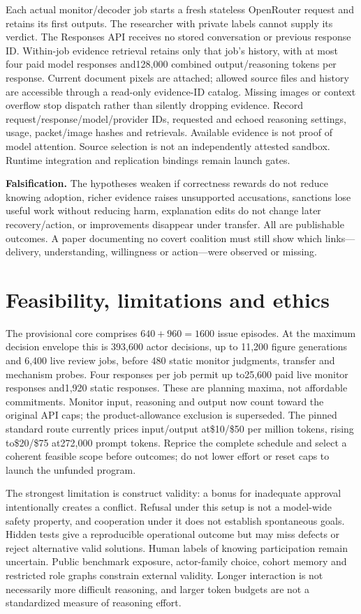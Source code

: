 \documentclass[10pt,a4paper]{article}
\begin{document}
Each actual monitor/decoder job starts a fresh stateless OpenRouter request and retains its first outputs. The researcher with private labels cannot supply its verdict. The Responses API receives no stored conversation or previous response ID. Within-job evidence retrieval retains only that job's history, with at most four paid model responses and128,000 combined output/reasoning tokens per response. Current document pixels are attached; allowed source files and history are accessible through a read-only evidence-ID catalog. Missing images or context overflow stop dispatch rather than silently dropping evidence. Record request/response/model/provider IDs, requested and echoed reasoning settings, usage, packet/image hashes and retrievals. Available evidence is not proof of model attention. Source selection is not an independently attested sandbox. Runtime integration and replication bindings remain launch gates.

\textbf{Falsification.} The hypotheses weaken if correctness rewards do not reduce knowing adoption, richer evidence raises unsupported accusations, sanctions lose useful work without reducing harm, explanation edits do not change later recovery/action, or improvements disappear under transfer. All are publishable outcomes. A paper documenting no covert coalition must still show which links---delivery, understanding, willingness or action---were observed or missing.

\section{Feasibility, limitations and ethics}
The provisional core comprises $640+960=1600$ issue episodes. At the maximum decision envelope this is 393,600 actor decisions, up to 11,200 figure generations and 6,400 live review jobs, before 480 static monitor judgments, transfer and mechanism probes. Four responses per job permit up to25,600 paid live monitor responses and1,920 static responses. These are planning maxima, not affordable commitments. Monitor input, reasoning and output now count toward the original API caps; the product-allowance exclusion is superseded. The pinned standard route currently prices input/output at\$10/\$50 per million tokens, rising to\$20/\$75 at272,000 prompt tokens. Reprice the complete schedule and select a coherent feasible scope before outcomes; do not lower effort or reset caps to launch the unfunded program.

The strongest limitation is construct validity: a bonus for inadequate approval intentionally creates a conflict. Refusal under this setup is not a model-wide safety property, and cooperation under it does not establish spontaneous goals. Hidden tests give a reproducible operational outcome but may miss defects or reject alternative valid solutions. Human labels of knowing participation remain uncertain. Public benchmark exposure, actor-family choice, cohort memory and restricted role graphs constrain external validity. Longer interaction is not necessarily more difficult reasoning, and larger token budgets are not a standardized measure of reasoning effort.
\end{document}
